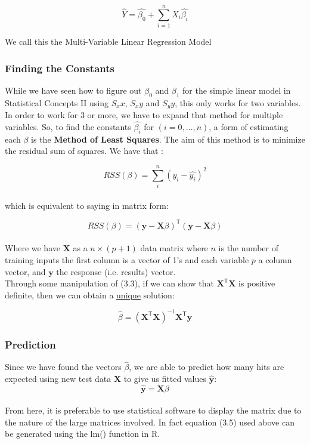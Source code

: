 \documentclass[11pt,a4paper]{report}
\begin{document}
\begin{equation}
   \hat{Y} = \hat{\beta_0} + \sum_{i=1}^{n} X_i\hat{\beta_i} 
\end{equation}


We call this the Multi-Variable Linear Regression Model

\subsubsection{Finding the Constants}
While we have seen how to figure out $\beta_0$ and $\beta_1$ for the simple linear model in Statistical Concepts II using $S_xx$, $S_xy$ and $S_yy$, this only works for two variables.
In order to work for 3 or more, we have to expand that method for multiple variables.
So, to find the constants $\hat{\beta_i}$ for \((i=0,...,n)\), a form of estimating each $\beta$ is the \textbf{Method of Least Squares}. The aim of this method is to minimize the residual sum of squares. We have that \cite[Section 3, p. 44-46]{ESL}:

\begin{equation}
  RSS(\beta) = \sum_{i}^{n}(y_i -\hat{y_i})^2  
\end{equation}\\
which is equivalent to saying in matrix form:

\begin{equation}
  RSS(\beta) = (\textbf{y} - \textbf{X}\beta)^\mathsf{T}  (\textbf{y} - \textbf{X}\beta)  
\end{equation}\\
Where we have $\textbf{X}$ as a $n \times (p + 1)$ data matrix where $n$ is the number of training inputs the first column is a vector of 1's and each variable $p$ a column vector, and $\textbf{y}$ the response (i.e. results) vector.\\
Through some manipulation of (3.3), if we can show that $\textbf{X}^\mathsf{T} \textbf{X}$ is positive definite, then we can obtain a \underline{unique} solution:

\begin{equation}
    \hat{\beta} = (\textbf{X}^\mathsf{T} \textbf{X})^{-1} \textbf{X}^\mathsf{T} \textbf{y}
\end{equation}

\subsubsection{Prediction}
Since we have found the vectors $\hat{\beta}$, we are able to predict how many hits are expected using new test data $\textbf{X}$ to give us fitted values $\hat{\textbf{y}}$:
\[ \hat{\textbf{y}} = \textbf{X}\beta \]\\
From here, it is preferable to use statistical software to display the matrix due to the nature of the large matrices involved. In fact equation (3.5) used above can be generated using the lm() function in R.
\end{document}
